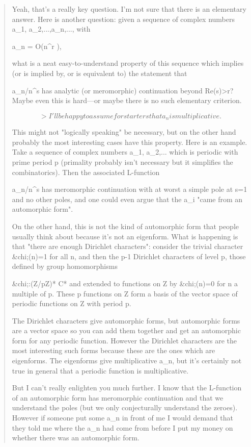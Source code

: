 \begin{quote}
 Yeah, that's a really key question. I'm not sure that there is an elementary
 answer.  Here is another question: given a sequence of complex numbers
 a_{1}, a_{2},...,a_{n},..., with 

a_{n} =
 O(n^{r }), 

 what is a neat easy-to-understand
 property of this sequence which implies (or is implied by, or is equivalent 
 to) the statement that 

\sum a_{n}/n^{s} 
has analytic (or meromorphic) continuation
 beyond Re(s)>r?  Maybe even this is hard---or maybe there is no such
 elementary criterion.


$$

 > I'll be happy to assume for starters that a_{n} is multiplicative.
$$
    

 This might not "logically speaking" be necessary, but on the other hand
 probably the most interesting cases have this property. Here is an
 example. Take a sequence of complex numbers a_{1}, 
 a_{2},... which
 is periodic with prime period p (primality probably isn't necessary but it
 simplifies the combinatorics). Then the associated L-function

 \sum a_{n}/n^{s}
 has
 meromorphic continuation with at worst a simple pole at s=1 and no
 other poles, and one could even argue that the a_{i} "came from an
 automorphic form".

 On the other hand, this is not the kind of automorphic form that
 people usually think about because it's not an eigenform. What is
 happening is that "there are enough Dirichlet characters": consider
 the trivial character &chi;(n)=1 for all n, and then the p-1 Dirichlet
 characters of level p, those defined by group homomorphisms 

&chi;:(Z/pZ)* \to  C*
 and extended to functions on Z by &chi;(n)=0 for n a multiple of p.
 These p functions on Z form a basis of the vector space of periodic functions
 on Z with period p.

 The Dirichlet characters give automorphic forms, but automorphic
 forms are a vector space so you can add them together and get
 an automorphic form for any periodic function. However the Dirichlet
 characters are the most interesting such forms because these are the ones
 which are eigenforms. The eigenforms give multiplicative a_{n}, but
 it's certainly not true in general that a periodic function is 
 multiplicative.
 
 But I can't really enlighten you much further. I know that the
 L-function of an automorphic form has meromorphic continuation
 and that we understand the poles (but we only conjecturally understand
 the zeroes). However if someone put some a_{n} in front of me I would
 demand that they told me where the a_{n} had come from before I put
 my money on whether there was an automorphic form.
 

\end{quote}
